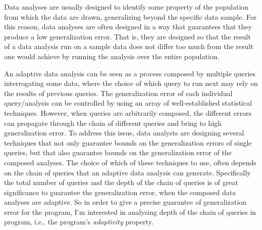 Data analyses are usually designed to identify some property of the population from which the data are drawn, generalizing beyond the specific data sample. For this reason, data analyses are often designed in a way that guarantees that they produce a low generalization error.
   That is, they are designed so that the result of a data analysis run on a sample data does not differ too much from the result one would achieve by running the analysis over the entire population. 
   
   An adaptive data analysis can be seen as a process composed by multiple queries interrogating some data, where the choice of which query to run next may rely on the results of previous queries. 
   The generalization error of each individual query/analysis can be controlled by using an array of well-established statistical techniques.
   However, when queries are arbitrarily composed, the different errors can propagate through the chain of different queries and bring to high generalization error. 
   To address this issue, data analysts are designing several techniques that not only guarantee bounds on the generalization errors of single queries, but that also guarantee bounds on the generalization error of the composed analyses. 
   The choice of which of these techniques to use, 
   often depends on the chain of queries that an adaptive data analysis can generate.
   Specifically the total number of queries and the depth of the chain of queries is of great significance 
   to guarantee the generalization error, 
   when the composed data analyses are adaptive. 
   So in order to give a precise guarantee of generalization error
   for the program,
    I'm interested in analysing depth of the chain of queries in program, i.e., the program's \emph{adaptivity} property.

